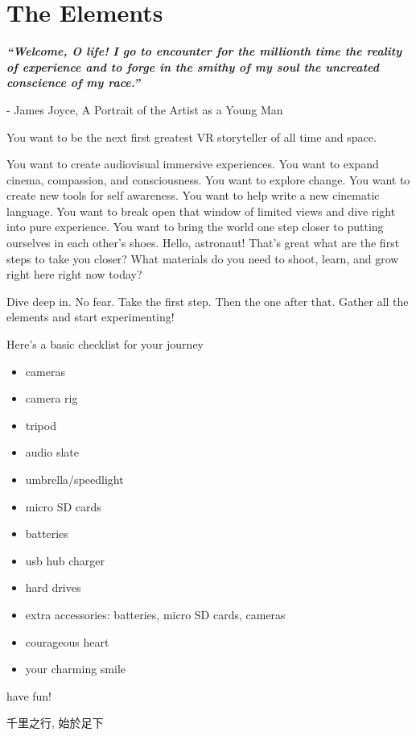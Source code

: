 \chapter{The Elements}
\pagecolor{white}
\label{chap:1}
\begin{fullwidth}

{\itshape\bfseries “Welcome, O life! I go to encounter for the millionth time the reality of experience and to forge in the smithy of my soul the uncreated conscience of my race.”}

- James Joyce, A Portrait of the Artist as a Young Man
\vspace{\baselineskip}

\problem

{\large You want to be the next first greatest VR storyteller of all time and space. \par}

You want to create audiovisual immersive experiences. You want to expand cinema, compassion, and consciousness. You want to explore change. You want to create new tools for self awareness. You want to help write a new cinematic language. You want to break open that window of limited views and dive right into pure experience. You want to bring the world one step closer to putting ourselves in each other’s shoes. Hello, astronaut! That’s great what are the first steps to take you closer? What materials do you need to shoot, learn, and grow right here right now today?

\solution

{\large Dive deep in. No fear. Take the first step. Then the one after that. Gather all the elements and start experimenting! \par}

Here’s a basic checklist for your journey

\begin{itemize}
\item cameras
\item camera rig
\item tripod
\item audio slate
\item umbrella/speedlight
\item micro SD cards
\item batteries
\item usb hub charger
\item hard drives
\item extra accessories: batteries, micro SD cards, cameras
\item courageous heart
\item your charming smile
\end{itemize}
                
have fun!

\begin{CJK*}{UTF8}{gbsn}
千里之行, 始於足下
\clearpage\end{CJK*}

\clearpage
\end{fullwidth}
